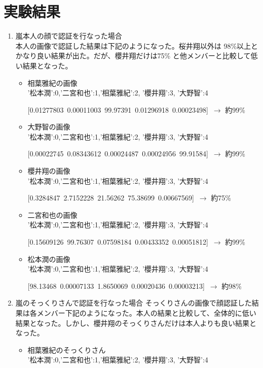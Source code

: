 \documentclass[a4paper, 11pt, titlepage]{jsarticle}
\begin{document}
\section{実験結果}
\begin{enumerate}
\item{嵐本人の顔で認証を行なった場合}\\
本人の画像で認証した結果は下記のようになった。桜井翔以外は 98\%以上とかなり良い結果が出た。だが、櫻井翔だけは75\% と他メンバーと比較して低い結果となった。\\
\begin{itemize}
\item{相葉雅紀の画像}\\
'松本潤':0,'二宮和也':1,'相葉雅紀':2, '櫻井翔':3, '大野智':4
 
[0.01277803\ 0.00011003\ 99.97391\ 0.01296918\ 0.00023498]\ $\rightarrow$ 約99\%
\item{大野智の画像}\\
'松本潤':0,'二宮和也':1,'相葉雅紀':2, '櫻井翔':3, '大野智':4

[0.00022745\ 0.08343612\ 0.00024487\ 0.00024956\ 99.91584]\ $\rightarrow$ 約99\%
\item{櫻井翔の画像}\\
'松本潤':0,'二宮和也':1,'相葉雅紀':2, '櫻井翔':3, '大野智':4

[0.3284847\ 2.7152228\ 21.56262\ 75.38699\ 0.00667569]\ $\rightarrow$ 約75\%
\item{二宮和也の画像}\\
'松本潤':0,'二宮和也':1,'相葉雅紀':2, '櫻井翔':3, '大野智':4

[0.15609126\ 99.76307\ 0.07598184\ 0.00433352\ 0.00051812]\ $\rightarrow$ 約99\%
\item{松本潤の画像}\\
'松本潤':0,'二宮和也':1,'相葉雅紀':2, '櫻井翔':3, '大野智':4

[98.13468\ 0.00007133\ 1.8650069\ 0.00020436\ 0.00003213]\ $\rightarrow$ 約98\% \\
\end{itemize}
\item{嵐のそっくりさんで認証を行なった場合}
そっくりさんの画像で顔認証した結果は各メンバー下記のようになった。本人の結果と比較して、全体的に低い結果となった。しかし、櫻井翔のそっくりさんだけは本人よりも良い結果となった。\\
\begin{itemize}
\item{相葉雅紀のそっくりさん}\\
'松本潤':0,'二宮和也':1,'相葉雅紀':2, '櫻井翔':3, '大野智':4


\end{itemize}
\end{enumerate}
\end{document}
